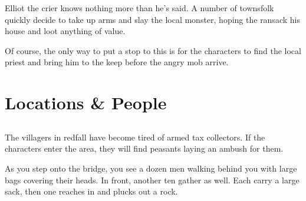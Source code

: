 Elliot the crier knows nothing more than he's said.  A number of townsfolk quickly decide to take up arms and slay the local monster, hoping the ransack his house and loot anything of value.

Of course, the only way to put a stop to this is for the characters to find the local priest and bring him to the keep before the angry mob arrive.

%
%
%
%
%

\section{Locations \& People}

\subsection{}
\vspace{-1cm}

\label{redfall_map}

The villagers in \gls{redfall} have become tired of armed tax collectors.  If the characters enter the area, they will find peasants laying an ambush for them.


\begin{boxtext}

	As you step onto the bridge, you see a dozen men walking behind you with large bags covering their heads.  In front, another ten gather as well.  Each carry a large sack, then one reaches in and plucks out a rock.

\end{boxtext}

